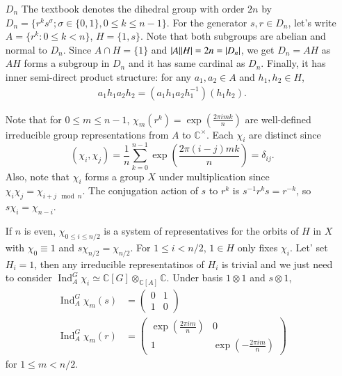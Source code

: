 \documentclass[a4paper, 12pt]{article}
\theoremstyle{Mydefinition}
\theoremstyle{Mytheorem}
\DeclareMathOperator{\Ind}{Ind}
\begin{document}
\begin{enumerate}
    \item[$D_n$] The textbook denotes the dihedral group with order $2n$ by $D_n=\{r^ks^\sigma;\sigma\in\{0,1\},0\leq k\leq n-1\}$. For the generator $s,r\in D_n$, let's write $A=\{r^k:0\leq k<n\}$, $H = \{1, s\}$. Note that both subgroups are abelian and normal to $D_n$. Since $A\cap H = \{1\}$ and $\abs{A}\abs{H} = 2n = \abs{D_n}$, we get $D_n = AH$ as $AH$ forms a subgroup in $D_n$ and it has same cardinal as $D_n$. Finally, it has inner semi-direct product structure: for any $a_1,a_2\in A$ and $h_1,h_2\in H$,
    \begin{equation}
    \begin{split}
        a_1h_1a_2h_2 = (a_1h_1a_2h_1^{-1})(h_1h_2).
    \end{split}
    \end{equation}
    
    Note that for $0\leq m\leq n-1$, $\chi_m(r^k) = \exp\left(\frac{2\pi i mk}{n}\right)$ are well-defined irreducible group representations from $A$ to $\mathbb{C}^\times$. Each $\chi_i$ are distinct since
    \begin{equation}
        (\chi_i,\chi_j) = \frac{1}{n}\sum_{k=0}^{n-1}\exp\left(\frac{2\pi (i-j) mk}{n}\right) = \delta_{ij}.
    \end{equation}
    Also, note that $\chi_i$ forms a group $X$ under multiplication since $\chi_i\chi_j = \chi_{i+j\mod n}$. The conjugation action of $s$ to $r^k$ is $s^{-1}r^ks = r^{-k}$, so $s\chi_i = \chi_{n-i}$.
    
    If $n$ is even, $\chi_{0\leq i\leq n/2}$ is a system of representatives for the orbits of $H$ in $X$ with $\chi_0\equiv 1$ and $s \chi_{n/2} = \chi_{n/2}$. For $1\leq i<n/2$, $1\in H$ only fixes $\chi_i$. Let' set $H_i = 1$, then any irreducible representatinos of $H_i$ is trivial and we just need to consider $\Ind_A^G \chi_i\simeq \mathbb{C}[G]\otimes_{\mathbb{C}[A]}\mathbb{C}$. Under basis $1\otimes 1$ and $s\otimes 1$,
    \begin{equation}
    \begin{split}
        \Ind_A^G\chi_m(s) &= \begin{pmatrix}
        0 & 1\\
        1 & 0
        \end{pmatrix}\\
        \Ind_A^G\chi_m(r) &= \begin{pmatrix}
        \exp\left(\frac{2\pi im}{n}\right) & 0\\
        1 & \exp\left(-\frac{2\pi im}{n}\right)
        \end{pmatrix}
    \end{split}
    \end{equation}
    for $1\leq m<n/2$.
    

\end{enumerate}
\end{document}
